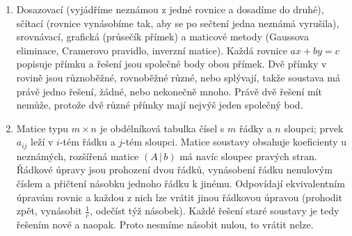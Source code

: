 \begin{enumerate}[label=\textbf{\arabic*.}, leftmargin=*, itemsep=0.8em]
  \item {}
  Dosazovací (vyjádříme neznámou z jedné rovnice a dosadíme do druhé), sčítací (rovnice vynásobíme tak, aby se po sečtení jedna neznámá vyrušila), srovnávací, grafická (průsečík přímek) a maticové metody (Gaussova eliminace, Cramerovo pravidlo, inverzní matice). Každá rovnice $ax + by = c$ popisuje přímku a řešení jsou společné body obou přímek. Dvě přímky v rovině jsou různoběžné, rovnoběžné různé, nebo splývají, takže soustava má právě jedno řešení, žádné, nebo nekonečně mnoho. Právě dvě řešení mít nemůže, protože dvě různé přímky mají nejvýš jeden společný bod.
  \begin{center}
  \end{center}

  \item {}
  Matice typu $m\times n$ je obdélníková tabulka čísel s $m$ řádky a $n$ sloupci; prvek $a_{ij}$ leží v $i$-tém řádku a $j$-tém sloupci. Matice soustavy obsahuje koeficienty u neznámých, rozšířená matice $(A\,|\,b)$ má navíc sloupec pravých stran. Řádkové úpravy jsou prohození dvou řádků, vynásobení řádku nenulovým číslem a přičtení násobku jednoho řádku k jinému. Odpovídají ekvivalentním úpravám rovnic a každou z nich lze vrátit jinou řádkovou úpravou (prohodit zpět, vynásobit $\frac{1}{c}$, odečíst týž násobek). Každé řešení staré soustavy je tedy řešením nové a naopak. Proto nesmíme násobit nulou, to vrátit nelze.


\end{enumerate}
